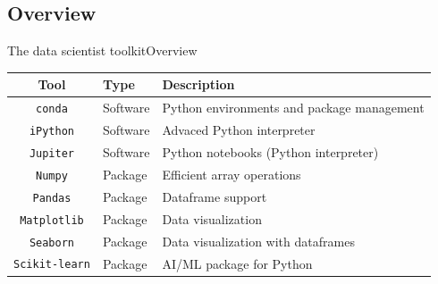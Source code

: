 \documentclass[10pt,compress]{beamer} %
\begin{document}
\subsection{Overview}

\begin{frame}{The data scientist toolkit}{Overview}
   \begin{tabular}{cll}\hline
       \textbf{Tool}& \textbf{Type} & \textbf{Description}\\ \hline
	   \texttt{conda} 	& Software & Python environments and package management \\
	   \texttt{iPython} & Software & Advaced Python interpreter \\
	   \texttt{Jupiter} & Software & Python notebooks (Python interpreter) \\
	   \texttt{Numpy}   & Package  & Efficient array operations \\
	   \texttt{Pandas}  & Package  & Dataframe support \\
	   \texttt{Matplotlib} & Package & Data visualization \\
	   \texttt{Seaborn} & Package & Data visualization with dataframes \\
	   \texttt{Scikit-learn} & Package & AI/ML package for Python \\
	   \hline
   \end{tabular}
\end{frame}
\end{document}
